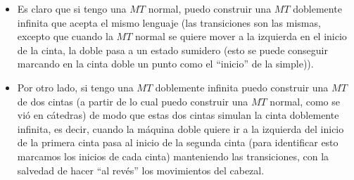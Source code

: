 \documentclass[dcc]{fcfmcourse}
\begin{document}
\begin{problems}
\begin{enumerate}[a)]
    \begin{itemize}
        \item Es claro que si tengo una $MT$ normal, puedo construir una $MT$ doblemente infinita que acepta el mismo lenguaje (las transiciones son las mismas, excepto que cuando la $MT$ normal se quiere mover a la izquierda en el inicio de la cinta, la doble pasa a un estado sumidero (esto se puede conseguir marcando en la cinta doble un punto como el ``inicio'' de la simple)).
        \item Por otro lado, si tengo una $MT$ doblemente infinita puedo construir una $MT$ de dos cintas (a partir de lo cual puedo construir una $MT$ normal, como se vió en cátedras) de modo que estas dos cintas simulan la cinta doblemente infinita, es decir, cuando la máquina doble quiere ir a la izquierda del inicio de la primera cinta pasa al inicio de la segunda cinta (para identificar esto marcamos los inicios de cada cinta) manteniendo las transiciones, con la salvedad de hacer ``al revés'' los movimientos del cabezal.
    \end{itemize}
\end{enumerate}
\end{problems}
\end{document}
